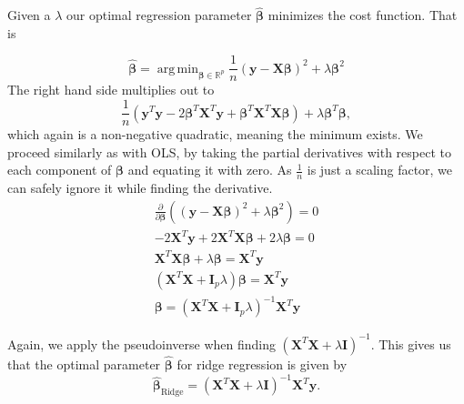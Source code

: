 \documentclass{article}
\DeclareMathOperator*{\argmin}{arg\,min}
\begin{document}
Given a $\lambda$ our optimal regression parameter $\boldsymbol{\hat{\beta}}$ minimizes the cost function. That is

\begin{equation*}
    \boldsymbol{\hat{\beta}} = \argmin_{\boldsymbol{\beta} \in \mathbb{R}^p} \frac{1}{n} \left( \boldsymbol{y} - \textbf{X} \boldsymbol{\beta} \right)^2 + \lambda \boldsymbol{\beta}^2
\end{equation*}
The right hand side multiplies out to
\begin{equation*}
    \frac{1}{n} \left( \boldsymbol{y}^T \boldsymbol{y} - 2 \boldsymbol{\beta}^T \textbf{X}^T \boldsymbol{y} + \boldsymbol{\beta}^T \textbf{X}^T \textbf{X} \boldsymbol{\beta} \right) + \lambda \boldsymbol{\beta}^T \boldsymbol{\beta},
\end{equation*}
which again is a non-negative quadratic, meaning the minimum exists. We proceed similarly as with OLS, by taking the partial derivatives with respect to each component of $\boldsymbol{\beta}$ and equating it with zero. As $\frac{1}{n}$ is just a scaling factor, we can safely ignore it while finding the derivative.
\begin{gather*}
    \frac{\partial}{\partial \boldsymbol{\beta}} \left( \left( \boldsymbol{y} - \textbf{X} \boldsymbol{\beta} \right)^2 + \lambda \boldsymbol{\beta}^2 \right) = 0 \\
    -2 \textbf{X}^T \boldsymbol{y} + 2 \textbf{X}^T \boldsymbol{X \beta} + 2\lambda \boldsymbol{\beta} = 0 \\
    \textbf{X}^T \boldsymbol{X \beta} + \lambda \boldsymbol{\beta} = \textbf{X}^T \boldsymbol{y} \\
    \left(\textbf{X}^T \textbf{X} + \boldsymbol{I}_p \lambda \right) \boldsymbol{\beta} = \textbf{X}^T \boldsymbol{y} \\
    \boldsymbol{\beta} = \left(\textbf{X}^T \textbf{X} + \boldsymbol{I}_p \lambda \right)^{-1} \textbf{X}^T \boldsymbol{y}
\end{gather*}

Again, we apply the pseudoinverse when finding $(\textbf{X}^T \textbf{X} + \lambda \boldsymbol{I})^{-1}$. This gives us that the optimal parameter $\boldsymbol{\hat{\beta}}$ for ridge regression is given by
\begin{equation*}
    \boldsymbol{\hat{\beta}}_\text{Ridge} = (\textbf{X}^T \textbf{X} + \lambda \boldsymbol{I})^{-1} \textbf{X}^T \boldsymbol{y}.
\end{equation*} 
\end{document}
